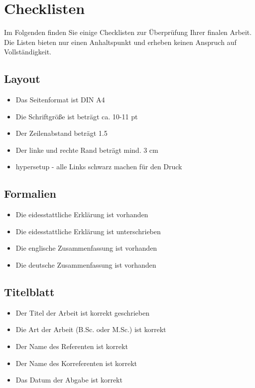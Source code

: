 \section{Checklisten}\label{sec:checklists}
%
Im Folgenden finden Sie einige Checklisten zur Überprüfung Ihrer finalen Arbeit. Die Listen bieten nur einen Anhaltspunkt und erheben keinen Anspruch auf Vollständigkeit. 

\subsection*{Layout}\label{sec:checklists:layout}
%
\begin{itemize}
  \vspace{-3mm}
  \item[\Square] Das Seitenformat ist DIN A4 
  \item[\Square] Die Schriftgröße ist beträgt ca. 10-11 pt
  \item[\Square] Der Zeilenabstand beträgt 1.5
  \item[\Square] Der linke und rechte Rand beträgt mind. 3 cm
  \item[\Square] hypersetup - alle Links schwarz machen für den Druck
\end{itemize}

\subsection*{Formalien}\label{sec:checklists:formalities}
%
\begin{itemize}
  \vspace{-3mm}
  \item[\Square] Die eidesstattliche Erklärung ist vorhanden
  \item[\Square] Die eidesstattliche Erklärung ist unterschrieben
  \item[\Square] Die englische Zusammenfassung ist vorhanden
  \item[\Square] Die deutsche Zusammenfassung ist vorhanden
\end{itemize}

\subsection*{Titelblatt}\label{sec:checklists:titlepage}
%
\begin{itemize}
  \vspace{-3mm}
  \item[\Square] Der Titel der Arbeit ist korrekt geschrieben
  \item[\Square] Die Art der Arbeit (B.Sc. oder M.Sc.) ist korrekt 
  \item[\Square] Der Name des Referenten ist korrekt
  \item[\Square] Der Name des Korreferenten ist korrekt
  \item[\Square] Das Datum der Abgabe ist korrekt
\end{itemize}


